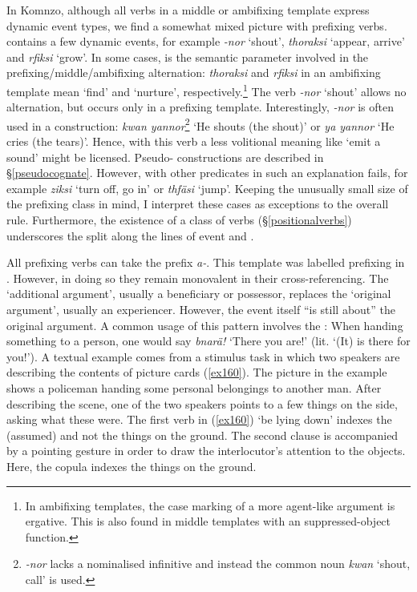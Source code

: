 In Komnzo, although all verbs in a middle or ambifixing template express dynamic event types, we find a somewhat mixed picture with prefixing verbs.  contains a few dynamic events, for example \emph{-nor} `shout', \emph{thoraksi} `appear, arrive' and \emph{rfiksi} `grow'. In some cases,  is the semantic parameter involved in the prefixing/middle/ambifixing alternation: \emph{thoraksi} and \emph{rfiksi} in an ambifixing  template mean `find' and `nurture', respectively.\footnote{In ambifixing templates, the case marking of a more agent-like argument is ergative. This is also found in middle templates with an suppressed-object function.} The verb \emph{-nor} `shout' allows no alternation, but occurs only in a prefixing template. Interestingly, \emph{-nor} is often used in a  construction: \emph{kwan yannor}\footnote{\emph{-nor} lacks a nominalised infinitive and instead the common noun \emph{kwan} `shout, call' is used.} `He shouts (the shout)' or \emph{ya yannor} `He cries (the tears)'. Hence, with this verb a less volitional meaning like `emit a sound' might be licensed. Pseudo- constructions are described in {\S}\ref{pseudocognate}. However, with other predicates in  such an explanation fails, for example \emph{ziksi} `turn off, go in' or \emph{thfäsi} `jump'. Keeping the unusually small size of the prefixing class in mind, I interpret these cases as exceptions to the overall rule. Furthermore, the existence of a class of  verbs ({\S}\ref{positionalverbs}) underscores the split along the lines of event  and .

All prefixing verbs can take the  prefix \emph{a-}. This template was labelled  prefixing in . However, in doing so they remain monovalent in their cross-referencing. The `additional argument', usually a beneficiary or possessor, replaces the `original argument', usually an experiencer. However, the event itself ``is still about'' the original argument. A common usage of this pattern involves the : When handing something to a person, one would say \emph{bnarä!} `There you are!' (lit. `(It) is there for you!'). A textual example comes from a stimulus task in which two speakers are describing the contents of picture cards (\ref{ex160}). The picture in the example shows a policeman handing some personal belongings to another man. After describing the scene, one of the two speakers points to a few things on the side, asking what these were. The first verb in (\ref{ex160}) `be lying down' indexes the (assumed)  and not the things on the ground. The second clause is accompanied by a pointing gesture in order to draw the interlocutor's attention to the objects. Here, the copula indexes the things on the ground.

